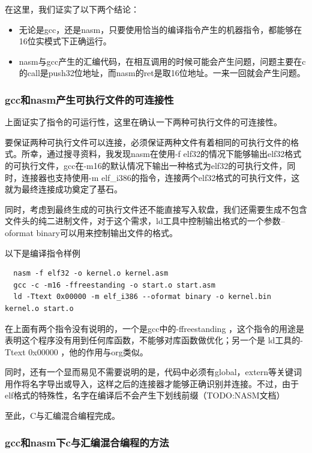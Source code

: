 \documentclass[forprint]{WHUBachelor}
\begin{document}
在这里，我们证实了以下两个结论：

\begin{itemize}
  \item 无论是gcc，还是nasm，只要使用恰当的编译指令产生的机器指令，都能够在16位实模式下正确运行。
  \item nasm与gcc产生的汇编代码，在相互调用的时候可能会产生问题，问题主要在c的call是push32位地址，而nasm的ret是取16位地址。一来一回就会产生问题。
\end{itemize}

\subsubsection{gcc和nasm产生可执行文件的可连接性}

上面证实了指令的可运行性，这里在确认一下两种可执行文件的可连接性。

要保证两种可执行文件可以连接，必须保证两种文件有着相同的可执行文件的格式。所幸，通过搜寻资料，我发现nasm在使用-f elf32的情况下能够输出elf32格式的可执行文件，gcc在-m16的默认情况下输出一种格式为elf32的可执行文件，同时，连接器也支持使用-m elf\_i386的指令，连接两个elf32格式的可执行文件，这就为最终连接成功奠定了基石。

同时，考虑到最终生成的可执行文件还不能直接写入软盘，我们还需要生成不包含文件头的纯二进制文件，对于这个需求，ld工具中控制输出格式的一个参数--oformat binary可以用来控制输出文件的格式。

以下是编译指令样例

\begin{lstlisting}
  nasm -f elf32 -o kernel.o kernel.asm
  gcc -c -m16 -ffreestanding -o start.o start.asm
  ld -Ttext 0x00000 -m elf_i386 --oformat binary -o kernel.bin kernel.o start.o
\end{lstlisting}

在上面有两个指令没有说明的，一个是gcc中的-ffreestanding ，这个指令的用途是表明这个程序没有用到任何库函数，不能够对库函数做优化；另一个是 ld工具的-Ttext 0x00000 ，他的作用与org类似。

同时，还有一个显而易见不需要说明的是，代码中必须有global，extern等关键词用作将名字导出或导入，这样之后的连接器才能够正确识别并连接。不过，由于elf格式的特殊性，名字在编译后不会产生下划线前缀（TODO:NASM文档）

至此，C与汇编混合编程完成。

\subsubsection{gcc和nasm下c与汇编混合编程的方法}
\end{document}
